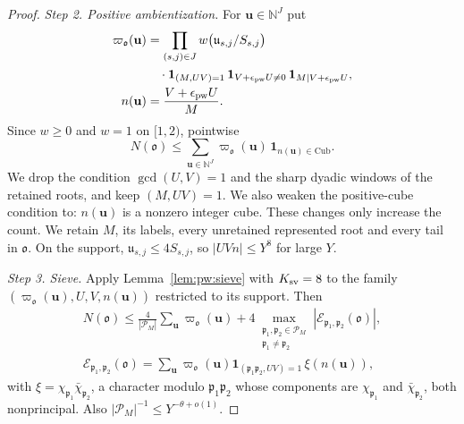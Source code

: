 \documentclass{amsart}
\theoremstyle{definition}
\theoremstyle{plain}
\numberwithin{equation}{section}
\numberwithin{table}{section}
\begin{document}
\begin{proof}
\emph{Step 2. Positive ambientization.} For $\mathbf u\in\mathbb N^J$ put
\begin{equation}\label{eq:pw:omega}
 \begin{aligned}
 \varpi_{\mathfrak o}(\mathbf u)&=\prod_{(s,j)\in J}w\bigl(\mathfrak u_{s,j}/S_{s,j}\bigr)\\
 &\quad\cdot\mathbf 1_{(M,UV)=1}\,\mathbf 1_{V+\epsilon_{\rm pw} U\ne0}\,
 \mathbf 1_{M\mid V+\epsilon_{\rm pw} U},\\
 n(\mathbf u)&=\frac{V+\epsilon_{\rm pw} U}{M}.
 \end{aligned}
\end{equation}
Since $w\ge0$ and $w=1$ on $[1,2)$, pointwise
\begin{equation}\label{eq:pw:amb}
 N(\mathfrak o)\le\sum_{\mathbf u\in\mathbb N^J}\varpi_{\mathfrak o}(\mathbf u)\,
 \mathbf 1_{n(\mathbf u)\in\mathrm{Cub}}.
\end{equation}
We drop the condition $\gcd(U,V)=1$ and the sharp dyadic windows of the
retained roots, and keep $(M,UV)=1$. We also weaken the positive-cube
condition to: $n(\mathbf u)$ is a nonzero integer cube. These changes only
increase the count. We retain $M$, its labels, every unretained represented root and every
tail in $\mathfrak o$. On the support,
$\mathfrak u_{s,j}\le4S_{s,j}$, so $|UVn|\le Y^{8}$ for large $Y$.

\emph{Step 3. Sieve.} Apply Lemma~\ref{lem:pw:sieve} with $K_{\rm sv}=8$ to the family
$(\varpi_{\mathfrak o}(\mathbf u),U,V,n(\mathbf u))$ restricted to its support.
Then
\begin{equation}\label{eq:pw:split}
 \begin{gathered}
 N(\mathfrak o)\le\frac4{|\mathcal P_M|}\sum_{\mathbf u}\varpi_{\mathfrak o}(\mathbf u)
 +4\max_{\substack{\mathfrak p_1,\mathfrak p_2\in\mathcal P_M\\\mathfrak p_1\ne \mathfrak p_2}}|\mathcal E_{\mathfrak p_1,\mathfrak p_2}(\mathfrak o)|,\\
 \mathcal E_{\mathfrak p_1,\mathfrak p_2}(\mathfrak o)=\sum_{\mathbf u}\varpi_{\mathfrak o}(\mathbf u)
 \mathbf 1_{(\mathfrak p_1\mathfrak p_2,UV)=1}\,\xi(n(\mathbf u)),
 \end{gathered}
\end{equation}
with $\xi=\chi_{\mathfrak p_1}\bar\chi_{\mathfrak p_2}$, a character modulo
$\mathfrak p_1\mathfrak p_2$ whose components are $\chi_{\mathfrak p_1}$ and
$\bar\chi_{\mathfrak p_2}$, both nonprincipal. Also
$|\mathcal P_M|^{-1}\le Y^{-\theta+o(1)}$.


\end{proof}
\end{document}
